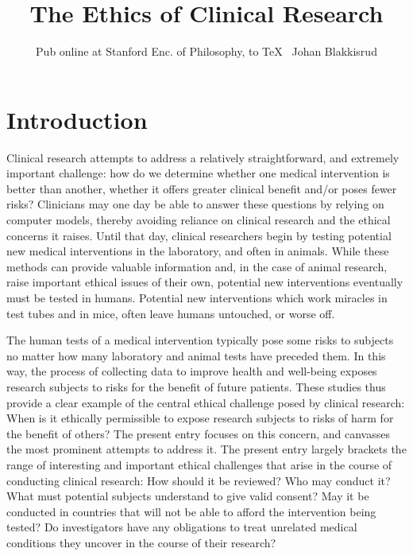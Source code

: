 \documentclass[12p]{article}
\title{The Ethics of Clinical Research}
\author{Pub online at Stanford Enc. of Philosophy, to \TeX ~ Johan Blakkisrud}
\begin{document}
\maketitle

\section{Introduction}

Clinical research attempts to address a relatively straightforward, and extremely important challenge: how do we determine whether one medical intervention is better than another, whether it offers greater clinical benefit and/or poses fewer risks? Clinicians may one day be able to answer these questions by relying on computer models, thereby avoiding reliance on clinical research and the ethical concerns it raises. Until that day, clinical researchers begin by testing potential new medical interventions in the laboratory, and often in animals. While these methods can provide valuable information and, in the case of animal research, raise important ethical issues of their own, potential new interventions eventually must be tested in humans. Potential new interventions which work miracles in test tubes and in mice, often leave humans untouched, or worse off.

The human tests of a medical intervention typically pose some risks to subjects no matter how many laboratory and animal tests have preceded them. In this way, the process of collecting data to improve health and well-being exposes research subjects to risks for the benefit of future patients. These studies thus provide a clear example of the central ethical challenge posed by clinical research: When is it ethically permissible to expose research subjects to risks of harm for the benefit of others? The present entry focuses on this concern, and canvasses the most prominent attempts to address it. The present entry largely brackets the range of interesting and important ethical challenges that arise in the course of conducting clinical research: How should it be reviewed? Who may conduct it? What must potential subjects understand to give valid consent? May it be conducted in countries that will not be able to afford the intervention being tested? Do investigators have any obligations to treat unrelated medical conditions they uncover in the course of their research?
\end{document}
